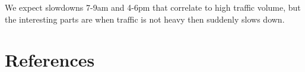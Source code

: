 \documentclass[11pt]{article}
\begin{document}
\begin{spacing}{1.2}
We expect slowdowns 7-9am and 4-6pm that correlate to high traffic volume, but the interesting parts are when traffic is not heavy then suddenly slows down.  


\section{References}
\label{sec:references}
\printbibliography[heading=none]


\clearpage
{}
\printindex

\end{spacing}
\end{document}

